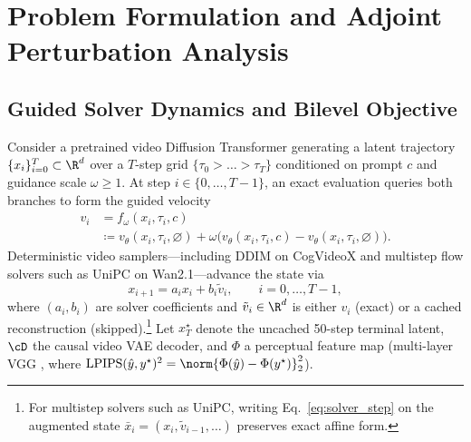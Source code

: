 \section{Problem Formulation and Adjoint Perturbation Analysis}
\label{sec:formulation}

\subsection{Guided Solver Dynamics and Bilevel Objective}
\label{sec:bilevel_obj}
Consider a pretrained video Diffusion Transformer generating a latent trajectory $\{x_i\}_{i=0}^T \subset \R^d$ over a $T$-step grid $\{\tau_0 > \dots > \tau_T\}$ conditioned on prompt $c$ and guidance scale $\omega \ge 1$. At step $i \in \{0,\dots,T-1\}$, an exact evaluation queries both branches to form the guided velocity
\begin{equation}
\begin{aligned}
v_i &= f_\omega(x_i, \tau_i, c) \\
&\coloneqq v_\theta(x_i, \tau_i, \varnothing) + \omega \bigl(v_\theta(x_i, \tau_i, c) - v_\theta(x_i, \tau_i, \varnothing)\bigr).
\end{aligned}
\label{eq:cfg_velocity}
\end{equation}
Deterministic video samplers---including DDIM \citep{song2021ddim} on CogVideoX and multistep flow solvers such as UniPC \citep{zhao2023unipc} on Wan2.1---advance the state via
\begin{equation}
x_{i+1} = a_i x_i + b_i \tilde{v}_i, \qquad i = 0, \dots, T - 1,
\label{eq:solver_step}
\end{equation}
where $(a_i, b_i)$ are solver coefficients and $\tilde{v}_i \in \R^d$ is either $v_i$ (exact) or a cached reconstruction (skipped).\footnote{For multistep solvers such as UniPC, writing Eq.~\eqref{eq:solver_step} on the augmented state $\bar{x}_i = (x_i, \tilde{v}_{i-1}, \dots)$ preserves exact affine form.} Let $x_T^\star$ denote the uncached 50-step terminal latent, $\cD$ the causal video VAE decoder, and $\Phi$ a perceptual feature map (multi-layer VGG \citep{zhang2018lpips}, where $\mathrm{LPIPS}(\hat{y}, y^\star)^2 = \norm{\Phi(\hat{y}) - \Phi(y^\star)}_2^2$).


